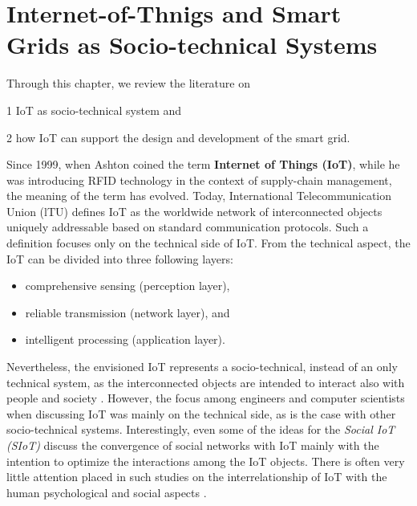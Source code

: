 \section{Internet-of-Thnigs and Smart Grids as Socio-technical Systems}
\label{sec:IoT_socio-techical}

\begin{svgraybox}
	Through this chapter, we review the literature on
	
	1 IoT as socio-technical system and
	
	2 how IoT can support the design and development of the smart grid.
\end{svgraybox}

Since 1999, when Ashton \cite{ashton2011internet} coined the term \textbf{Internet of Things (IoT)}, while he was introducing RFID technology in the context of supply-chain management, the meaning of the term has evolved. Today, International Telecommunication Union (lTU) defines IoT as the worldwide network of interconnected objects uniquely addressable based on standard communication protocols. Such a definition focuses only on the technical side of IoT. From the technical aspect, the IoT can be divided into three following layers:
\begin{itemize}
	\item comprehensive sensing (perception layer),
	\item reliable transmission (network layer), and
	\item intelligent processing (application layer).
\end{itemize}
Nevertheless, the envisioned IoT represents a socio-technical, instead of an only technical system, as the interconnected objects are intended to interact also with people and society \cite{atzori2014smart,Shin2014}. 
However, the focus among engineers and computer scientists when discussing IoT was mainly on the technical side, as is the case with other socio-technical systems.
Interestingly, even some of the ideas for the \textit{Social IoT (SIoT)} \cite{atzori2012social,guinard2010sharing,atzori2014smart} discuss the convergence of social networks with IoT mainly with the intention to optimize the interactions among the IoT objects. There is often very little attention placed in such studies on the interrelationship of IoT with the human psychological and social aspects \cite{atzori2012social,guinard2010sharing}. 

